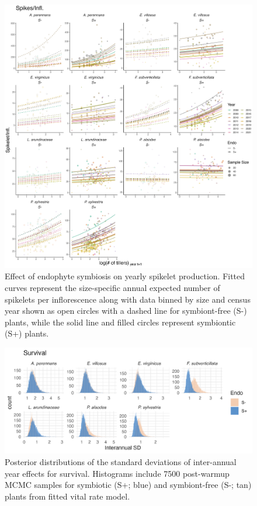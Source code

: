 \documentclass[9pt,twoside,lineno]{pnas-new}
\begin{document}
\begin{figure}
	\centering
	\includegraphics[width=\linewidth]{spike_yearplot.png}
	\caption{Effect of endophyte symbiosis on yearly spikelet production. Fitted curves represent the size-specific annual expected number of spikelets per inflorescence along with data binned by size and census year shown as open circles with a dashed line for symbiont-free (S-) plants, while the solid line and filled circles represent symbiontic (S+) plants.}
\end{figure}


\begin{figure}
	\centering
	\includegraphics[width=.9\linewidth]{surv_sigmayear_hist.png}
	\caption{Posterior distributions of the standard deviations of inter-annual year effects for survival. Histograms include 7500 post-warmup MCMC samples for symbiotic (S+; blue) and symbiont-free (S-; tan) plants from fitted vital rate model.}
\end{figure}
\end{document}
